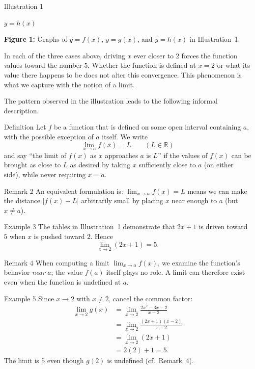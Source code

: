 \begin{examplebox}{Illustration 1}
\begin{center}
\begin{minipage}{0.32\textwidth}
\small\textbf{\(y = h(x)\)}
\end{minipage}

\medskip
\textbf{Figure 1:} Graphs of \(y = f(x)\), \(y = g(x)\), and \(y = h(x)\) in Illustration~1.
\end{center}

In each of the three cases above, driving \(x\) ever closer to \(2\) forces the function values toward the number \(5\).  Whether the function is defined at \(x = 2\) or what its value there happens to be does not alter this convergence.  This phenomenon is what we capture with the notion of a limit.
\end{examplebox}

\bigskip

The pattern observed in the illustration leads to the following informal description.

\begin{definitionbox}{Definition}
Let \(f\) be a function that is defined on some open interval containing \(a\), with the possible exception of \(a\) itself.  We write
\[
\lim_{x \to a} f(x) = L \qquad (L \in \mathbb{R})
\]
and say ``the limit of \(f(x)\) as \(x\) approaches \(a\) is \(L\)'' if the values of \(f(x)\) can be brought as close to \(L\) as desired by taking \(x\) sufficiently close to \(a\) (on either side), while never requiring \(x = a\).
\end{definitionbox}

\begin{remarkbox}{Remark 2}
An equivalent formulation is: \(\displaystyle\lim_{x \to a} f(x) = L\) means we can make the distance \(|f(x) - L|\) arbitrarily small by placing \(x\) near enough to \(a\) (but \(x \neq a\)).
\end{remarkbox}

\begin{examplebox}{Example 3}
The tables in Illustration~1 demonstrate that \(2x+1\) is driven toward \(5\) when \(x\) is pushed toward \(2\).  Hence
\[
\lim_{x \to 2} (2x + 1) = 5.
\]
\end{examplebox}

\begin{remarkbox}{Remark 4}
When computing a limit \(\displaystyle\lim_{x \to a} f(x)\), we examine the function's behavior \emph{near} \(a\); the value \(f(a)\) itself plays no role.  A limit can therefore exist even when the function is undefined at \(a\).
\end{remarkbox}

\begin{examplebox}{Example 5}
Since \(x \to 2\) with \(x \neq 2\), cancel the common factor:
\[
\begin{aligned}
\lim_{x \to 2} g(x)
&= \lim_{x \to 2} \frac{2x^{2} - 3x - 2}{x - 2} \\[6pt]
&= \lim_{x \to 2} \frac{(2x + 1)(x - 2)}{x - 2} \\[6pt]
&= \lim_{x \to 2} (2x + 1) \\[6pt]
&= 2(2) + 1 = 5.
\end{aligned}
\]
The limit is \(5\) even though \(g(2)\) is undefined (cf.\ Remark~4).
\end{examplebox}

